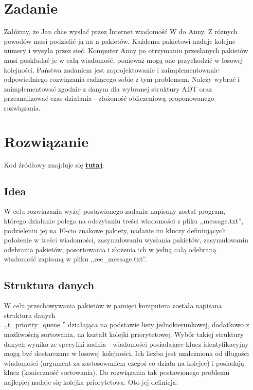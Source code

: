 \documentclass[12pt]{article}
\begin{document}
    


\section{Zadanie}


Załóżmy, że Jan chce wysłać przez Internet wiadomość W do Anny. Z różnych powodów musi podzielić
ją na n pakietów. Każdemu pakietowi nadaje kolejne numery i wysyła przez sieć. Komputer Anny po otrzymaniu
przesłanych pakietów musi poskładać je w całą wiadomość, ponieważ mogą one przychodzić w losowej
kolejności. Państwa zadaniem jest zaprojektowanie i zaimplementowanie odpowiedniego rozwiązania radzącego
sobie z tym problemem. Należy wybrać i zaimplementować zgodnie z danym dla wybranej struktury
ADT oraz przeanalizować czas działania - złożoność obliczeniową proponowanego rozwiązania.

\section{Rozwiązanie}

Kod źródłowy znajduje się  \href{https://github.com/PartyKusZ/PAMSI}{\textbf{tutaj}}.

\subsection{Idea}

W celu rozwiązania wyżej postawionego zadania napisany został program, którego działanie polega na odczytaniu treści wiadomości z pliku ,,message.txt'',
podzieleniu jej na 10-cio znakowe pakiety, nadanie im kluczy definiujących położenie w treści wiadomości, zasymulowaniu wysłania pakietów, zasymulowaniu 
odebrania pakietów, posortowania i złożenia ich w jedną całą odebraną wiadomość zapisaną w pliku ,,rec\_message.txt''.

\subsection{Struktura danych}

W celu przechowywania pakietów w pamięci komputera została napisana struktura danych \\,,t\_priority\_queue '' działająca na podstawie listy jednokierunkowej, dodatkowo z możliwością sortowania,
na kształt kolejki priorytetowej. Wybór takiej struktury danych wynika ze specyfiki zadnia - wiadomości posiadające klucz identyfikacyjny mogą być dostarczane w losowej kolejności.
Ich liczba jest uzależniona od długości wiadomości (argument za zastosowaniem czegoś co działa na kolejce) i posiadają klucz (konieczność sortowania). 
Do rozwiązania tak postawionego problemu najlepiej nadaje się kolejka priorytetowa.  
Oto jej definicja:\\
\small{
}
\end{document}
